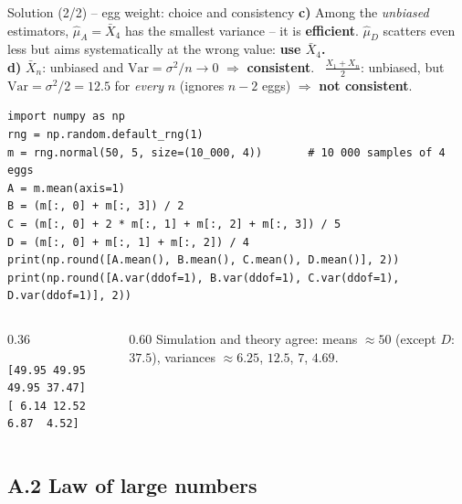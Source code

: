 \documentclass[aspectratio=169,11pt]{beamer}
\begin{document}
\begin{frame}[fragile]{Solution (2/2) -- egg weight: choice and consistency}
  \small
  \textbf{c)} Among the \emph{unbiased} estimators, $\hat\mu_A=\bar X_4$ has
  the smallest variance -- it is \textbf{efficient}. $\hat\mu_D$ scatters even
  less but aims systematically at the wrong value: \textbf{use $\bar X_4$.}\\[2pt]
  \textbf{d)} $\bar X_n$: unbiased and $\mathrm{Var}=\sigma^2/n\to0$
  $\Rightarrow$ \textbf{consistent}. \ $\tfrac{X_1+X_n}{2}$: unbiased, but
  $\mathrm{Var}=\sigma^2/2=12.5$ for \emph{every} $n$ (ignores $n-2$ eggs)
  $\Rightarrow$ \textbf{not consistent}.
\begin{lstlisting}
import numpy as np
rng = np.random.default_rng(1)
m = rng.normal(50, 5, size=(10_000, 4))       # 10 000 samples of 4 eggs
A = m.mean(axis=1)
B = (m[:, 0] + m[:, 3]) / 2
C = (m[:, 0] + 2 * m[:, 1] + m[:, 2] + m[:, 3]) / 5
D = (m[:, 0] + m[:, 1] + m[:, 2]) / 4
print(np.round([A.mean(), B.mean(), C.mean(), D.mean()], 2))
print(np.round([A.var(ddof=1), B.var(ddof=1), C.var(ddof=1), D.var(ddof=1)], 2))
\end{lstlisting}
  \vspace{-4pt}
  \begin{columns}[T]
    \begin{column}{0.36\textwidth}
\begin{lstlisting}[style=Pyout]
[49.95 49.95 49.95 37.47]
[ 6.14 12.52  6.87  4.52]
\end{lstlisting}
    \end{column}
    \begin{column}{0.60\textwidth}
      Simulation and theory agree: means $\approx50$ (except $D$:
      $37.5$), variances $\approx6.25$, $12.5$, $7$, $4.69$.
    \end{column}
  \end{columns}
\end{frame}

\subsection{A.2 Law of large numbers}
\end{document}
